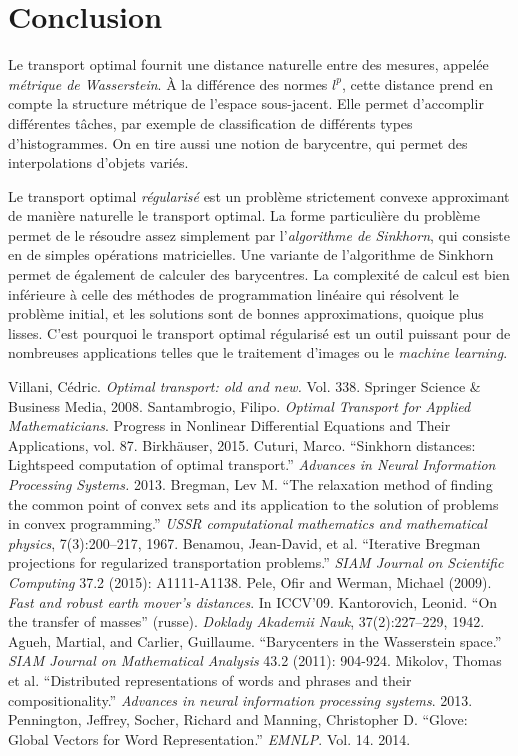 \section{Conclusion}

Le transport optimal fournit une distance naturelle entre des mesures, appelée \emph{métrique de Wasserstein}. À la différence des normes $l^p$, cette distance prend en compte la structure métrique de l'espace sous-jacent. Elle permet d'accomplir différentes tâches, par exemple de classification de différents types d'histogrammes. On en tire aussi une notion de barycentre, qui permet des interpolations d'objets variés.

Le transport optimal \emph{régularisé} est un problème strictement convexe approximant de manière naturelle le transport optimal. La forme particulière du problème permet de le résoudre assez simplement par l'\emph{algorithme de Sinkhorn}, qui consiste en de simples opérations matricielles.
Une variante de l'algorithme de Sinkhorn permet de également de calculer des barycentres.
La complexité de calcul est bien inférieure à celle des méthodes de programmation linéaire qui résolvent le problème initial, et les solutions sont de bonnes approximations, quoique plus lisses.
C'est pourquoi le transport optimal régularisé est un outil puissant pour de nombreuses applications telles que le traitement d'images ou le \emph{machine learning}.

\medskip
\begin{thebibliography}{99}
Villani, Cédric. \textit{Optimal transport: old and new.} Vol. 338. Springer Science \& Business Media, 2008.
Santambrogio, Filipo. \textit{Optimal Transport for Applied Mathematicians}. Progress in Nonlinear Differential Equations and Their Applications, vol. 87. Birkhäuser, 2015.
Cuturi, Marco. ``Sinkhorn distances: Lightspeed computation of optimal transport.'' \textit{Advances in Neural Information Processing Systems.} 2013.
Bregman, Lev M. ``The relaxation method of finding the common point of
convex sets and its application to the solution of problems in convex programming.''
\textit{USSR computational mathematics and mathematical physics},
7(3):200–217, 1967.
Benamou, Jean-David, et al. ``Iterative Bregman projections for regularized transportation problems.'' \textit{SIAM Journal on Scientific Computing} 37.2 (2015): A1111-A1138.
Pele, Ofir and Werman, Michael (2009). \textit{Fast and robust earth mover’s distances}. In ICCV’09.
Kantorovich, Leonid. ``On the transfer of masses'' (russe). \textit{Doklady Akademii
Nauk}, 37(2):227–229, 1942.
Agueh, Martial, and Carlier, Guillaume. ``Barycenters in the Wasserstein space.'' \textit{SIAM Journal on Mathematical Analysis} 43.2 (2011): 904-924.
Mikolov, Thomas et al. ``Distributed representations of words and phrases and their compositionality.'' \textit{Advances in neural information processing systems}. 2013.
Pennington, Jeffrey, Socher, Richard and Manning, Christopher D. ``Glove: Global Vectors for Word Representation.'' \textit{EMNLP}. Vol. 14. 2014.
\end{thebibliography}

